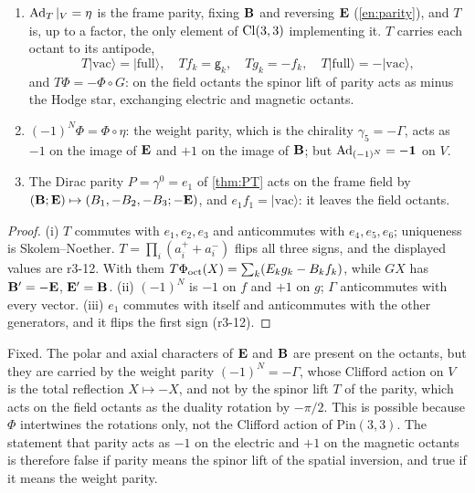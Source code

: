 \begin{proposition}
\label{r3:prop:parity}
\begin{enumerate}[label=(\roman*),leftmargin=2.2em]
\item $\operatorname{Ad}_T|_V=\eta$ is the frame parity, fixing $\mathbf B$ and reversing $\mathbf E$ (\cref{en:parity}), and $T$ is, up to a factor, the only
element of $\mathrm{Cl}(3,3)$ implementing it. $T$ carries each octant to its antipode,
\[
T|\mathrm{vac}\rangle=|\mathrm{full}\rangle,\quad Tf_k=\mathsf g_k,\quad Tg_k=-f_k,\quad T|\mathrm{full}\rangle=-|\mathrm{vac}\rangle,
\]
and $T\Phi=-\Phi\circ G$: on the field octants the spinor lift of parity acts as minus the Hodge star, exchanging electric and magnetic octants.
\item $(-1)^N\Phi=\Phi\circ\eta$: the weight parity, which is the chirality $\gamma_5=-\Gamma$, acts as $-1$ on the image of $\mathbf E$ and $+1$ on the image
of $\mathbf B$; but $\operatorname{Ad}_{(-1)^N}=-\mathbf 1$ on $V$.
\item The Dirac parity $P=\gamma^0=e_1$ of \cref{thm:PT} acts on the frame field by
$(\mathbf B;\mathbf E)\mapsto(B_1,-B_2,-B_3;-\mathbf E)$, and $e_1f_1=|\mathrm{vac}\rangle$: it leaves the field octants.
\end{enumerate}
\end{proposition}

\begin{proof}
(i) $T$ commutes with $e_1,e_2,e_3$ and anticommutes with $e_4,e_5,e_6$; uniqueness is Skolem--Noether. $T=\prod_i(a^+_i+a^-_i)$ flips all three
signs, and the displayed values are r3-12. With them $T\Phi_{\rm oct}(X)=\sum_k(E_kg_k-B_kf_k)$, while $GX$ has $\mathbf B'=-\mathbf E$, $\mathbf E'=\mathbf B$. (ii) $(-1)^N$ is $-1$ on
$f$ and $+1$ on $g$; $\Gamma$ anticommutes with every vector. (iii) $e_1$ commutes with itself and anticommutes with the other generators,
and it flips the first sign (r3-12).
\end{proof}

Fixed. The polar and axial characters of $\mathbf E$ and $\mathbf B$ are present on the octants, but they are carried by the weight parity
$(-1)^N=-\Gamma$, whose Clifford action on $V$ is the total reflection $X\mapsto-X$, and not by the spinor lift $T$ of the parity, which acts on
the field octants as the duality rotation by $-\pi/2$. This is possible because $\Phi$ intertwines the rotations only, not the Clifford
action of $\mathrm{Pin}(3,3)$. The statement that parity acts as $-1$ on the electric and $+1$ on the magnetic octants is therefore false if
parity means the spinor lift of the spatial inversion, and true if it means the weight parity.


